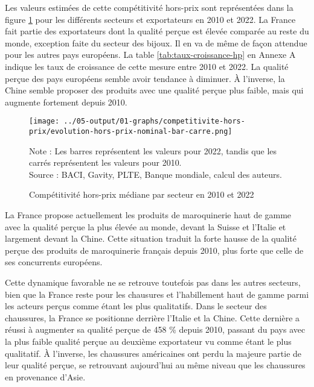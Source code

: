\documentclass[french,10pt,a4paper]{article}
\begin{document}
Les valeurs estimées de cette compétitivité hors-prix sont représentées dans la figure \ref{fig:hors-prix} pour les différents secteurs et exportateurs en 2010 et 2022. La France fait partie des exportateurs dont la qualité perçue est élevée comparée au reste du monde, exception faite du secteur des bijoux. Il en va de même de façon attendue pour les autres pays européens. La table \ref{tab:taux-croissance-hp} en Annexe A indique les taux de croissance de cette mesure entre 2010 et 2022. La qualité perçue des pays européens semble avoir tendance à diminuer. À l'inverse, la Chine semble proposer des produits avec une qualité perçue plus faible, mais qui augmente fortement depuis 2010.

\begin{figure}[!h]
  \centering
  \texttt{[image: ../05-output/01-graphs/competitivite-hors-prix/evolution-hors-prix-nominal-bar-carre.png]}
  \captionsetup{justification=justified, singlelinecheck=false, font=small}
  \caption*{Note : Les barres représentent les valeurs pour 2022, tandis que les carrés représentent les valeurs pour 2010. \\
  Source : BACI, Gavity, PLTE, Banque mondiale, calcul des auteurs.}
  \captionsetup{justification=centering, singlelinecheck=true, font=normalsize}
  \caption{Compétitivité hors-prix médiane par secteur en 2010 et 2022}
  \label{fig:hors-prix}
\end{figure}

\bigskip

La France propose actuellement les produits de maroquinerie haut de gamme avec la qualité perçue la plus élevée au monde, devant la Suisse et l'Italie et largement devant la Chine. Cette situation traduit la forte hausse de la qualité perçue des produits de maroquinerie français depuis 2010, plus forte que celle de ses concurrents européens.

Cette dynamique favorable ne se retrouve toutefois pas dans les autres secteurs, bien que la France reste pour les chausures et l'habillement haut de gamme parmi les acteurs perçus comme étant les plus qualitatifs. Dans le secteur des chaussures, la France se positionne derrière l'Italie et la Chine. Cette dernière a réussi à augmenter sa qualité perçue de 458 \% depuis 2010, passant du pays avec la plus faible qualité perçue au deuxième exportateur vu comme étant le plus qualitatif. À l'inverse, les chaussures américaines ont perdu la majeure partie de leur qualité perçue, se retrouvant aujourd'hui au même niveau que les chaussures en provenance d'Asie.
\end{document}
